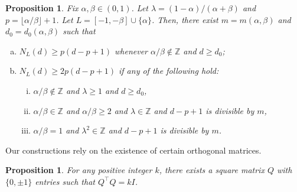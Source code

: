 \documentclass[reqno, 11pt]{amsart}
\newtheorem{proposition}[theorem]{Proposition}
\theoremstyle{definition}
\theoremstyle{remark}
\newcommand{\ZZ}{\mathbb{Z}}
\begin{document}
\begin{proposition}\label{prop:lower}
    Fix $\alpha, \beta \in (0,1)$. Let $\lambda = (1-\alpha)/(\alpha + \beta)$ and $p = \lfloor \alpha/\beta \rfloor + 1$. Let $L = [-1,-\beta]\cup \{\alpha\}$. Then, there exist $m = m(\alpha, \beta)$ and $d_0 = d_0(\alpha, \beta)$ such that
    \begin{enumerate}[(a)]
        \item \label{itm:lower-nint-p} $N_L(d) \geq p(d-p+1)$ whenever $\alpha/\beta \notin \ZZ$ and $d \geq d_0$; 
        \item \label{itm:lower-2p}  $N_L(d) \geq 2p(d-p+1)$ if any of the following hold: 
        \begin{enumerate}[(i)]
            \item \label{itm:lower-nint-2p} $\alpha/\beta \notin \ZZ$ and $\lambda \geq 1$ and $d \geq d_0$,
            \item \label{itm:lower-int-2p}  $\alpha/\beta \in \ZZ$ and $\alpha/\beta \geq 2$ and $\lambda \in \ZZ$ and $d-p+1$ is divisible by $m$,
            \item \label{itm:lower-4} $\alpha/\beta = 1$ and $\lambda^2 \in \ZZ$ and $d-p+1$ is divisible by $m$.
        \end{enumerate}
    \end{enumerate}
\end{proposition}

Our constructions rely on the existence of certain orthogonal matrices.

\begin{proposition}\label{prop:matrix}
    For any positive integer $k$, there exists a square matrix $Q$ with $\{0, \pm 1\}$ entries such that $Q^\intercal Q = k I$. 
\end{proposition}
\end{document}
